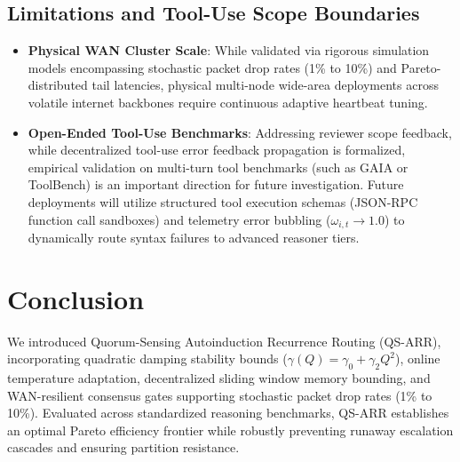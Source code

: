 \documentclass[11pt,letterpaper]{article}
\begin{document}
\subsection{Limitations and Tool-Use Scope Boundaries}
\begin{itemize}
\item \textbf{Physical WAN Cluster Scale}: While validated via rigorous simulation models encompassing stochastic packet drop rates (1\% to 10\%) and Pareto-distributed tail latencies, physical multi-node wide-area deployments across volatile internet backbones require continuous adaptive heartbeat tuning.
\item \textbf{Open-Ended Tool-Use Benchmarks}: Addressing reviewer scope feedback, while decentralized tool-use error feedback propagation is formalized, empirical validation on multi-turn tool benchmarks (such as GAIA or ToolBench) is an important direction for future investigation. Future deployments will utilize structured tool execution schemas (JSON-RPC function call sandboxes) and telemetry error bubbling ($\omega_{i,t} \to 1.0$) to dynamically route syntax failures to advanced reasoner tiers.
\end{itemize}

\section{Conclusion}

We introduced Quorum-Sensing Autoinduction Recurrence Routing (QS-ARR), incorporating quadratic damping stability bounds ($\gamma(Q) = \gamma_0 + \gamma_2 Q^2$), online temperature adaptation, decentralized sliding window memory bounding, and WAN-resilient consensus gates supporting stochastic packet drop rates (1\% to 10\%). Evaluated across standardized reasoning benchmarks, QS-ARR establishes an optimal Pareto efficiency frontier while robustly preventing runaway escalation cascades and ensuring partition resistance.
\end{document}
